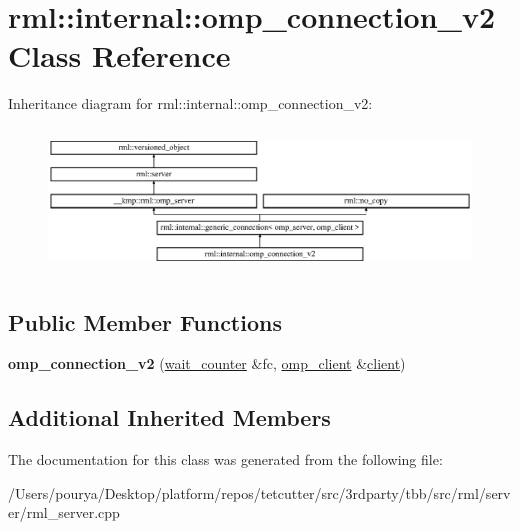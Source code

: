 \hypertarget{classrml_1_1internal_1_1omp__connection__v2}{}\section{rml\+:\+:internal\+:\+:omp\+\_\+connection\+\_\+v2 Class Reference}
\label{classrml_1_1internal_1_1omp__connection__v2}
Inheritance diagram for rml\+:\+:internal\+:\+:omp\+\_\+connection\+\_\+v2\+:\begin{figure}[H]
\begin{center}
\leavevmode
\includegraphics[height=3.856750cm]{classrml_1_1internal_1_1omp__connection__v2}
\end{center}
\end{figure}
\subsection*{Public Member Functions}
\begin{DoxyCompactItemize}
\item 
\hypertarget{classrml_1_1internal_1_1omp__connection__v2_a8fc32b13a96f6b4ee1ab0b6c9b82459d}{}{\bfseries omp\+\_\+connection\+\_\+v2} (\hyperlink{classrml_1_1internal_1_1wait__counter}{wait\+\_\+counter} \&fc, \hyperlink{class____kmp_1_1rml_1_1omp__client}{omp\+\_\+client} \&\hyperlink{classrml_1_1client}{client})\label{classrml_1_1internal_1_1omp__connection__v2_a8fc32b13a96f6b4ee1ab0b6c9b82459d}

\end{DoxyCompactItemize}
\subsection*{Additional Inherited Members}


The documentation for this class was generated from the following file\+:\begin{DoxyCompactItemize}
\item 
/\+Users/pourya/\+Desktop/platform/repos/tetcutter/src/3rdparty/tbb/src/rml/server/rml\+\_\+server.\+cpp\end{DoxyCompactItemize}
